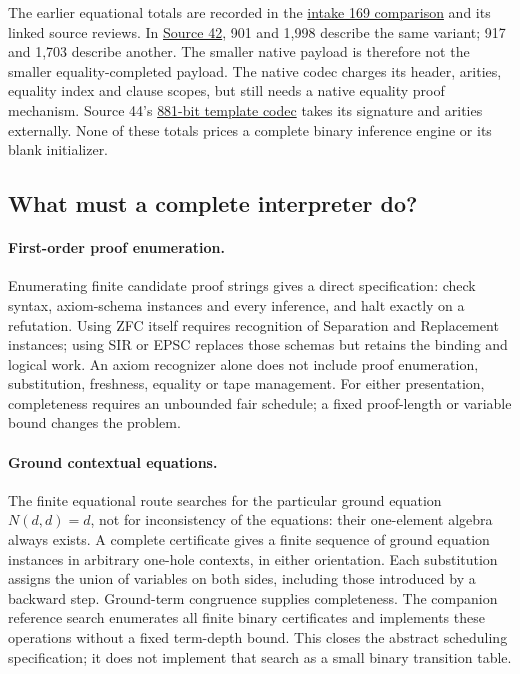 The earlier equational totals are recorded in the
\href{https://github.com/VladimirReshetnikov/ProveIt/blob/13ec39ed43148b1807f51ed6e6528e1c84659562/SetTheory/Cardinals/docs/reports/set-theory/zfc-closure-kernels/intake-169.md}{intake 169 comparison}
and its linked source reviews. In
\href{https://github.com/VladimirReshetnikov/ProveIt/blob/13ec39ed43148b1807f51ed6e6528e1c84659562/SetTheory/Cardinals/docs/reports/set-theory/zfc-closure-kernels/intake-155-source-42.md}{Source 42},
901 and 1,998 describe the same variant; 917 and 1,703 describe another.
The smaller native payload is therefore not the smaller equality-completed
payload. The native codec charges its header, arities, equality index and
clause scopes, but still needs a native equality proof mechanism.
Source 44's
\href{https://github.com/VladimirReshetnikov/ProveIt/blob/13ec39ed43148b1807f51ed6e6528e1c84659562/SetTheory/Cardinals/docs/reports/set-theory/zfc-closure-kernels/code/44-nine-code-ground_kernel.py}{881-bit template codec}
takes its signature and arities externally. None of these totals prices a
complete binary inference engine or its blank initializer.

\subsection{What must a complete interpreter do?}

\paragraph{First-order proof enumeration.}
Enumerating finite candidate proof strings gives a direct specification:
check syntax, axiom-schema instances and every inference, and halt exactly
on a refutation. Using ZFC itself requires recognition of Separation and
Replacement instances; using SIR or EPSC replaces those schemas but retains
the binding and logical work. An axiom recognizer alone does not include
proof enumeration, substitution, freshness, equality or tape management.
For either presentation, completeness requires an unbounded fair schedule;
a fixed proof-length or variable bound changes the problem.

\paragraph{Ground contextual equations.}
The finite equational route searches for the particular ground equation
$N(d,d)=d$, not for inconsistency of the equations: their one-element
algebra always exists. A complete certificate gives a finite sequence of
ground equation instances in arbitrary one-hole contexts, in either
orientation. Each substitution assigns the union of variables on both
sides, including those introduced by a backward step. Ground-term
congruence supplies completeness. The companion reference search enumerates
all finite binary certificates and implements these operations without a
fixed term-depth bound. This closes the abstract scheduling specification;
it does not implement that search as a small binary transition table.


